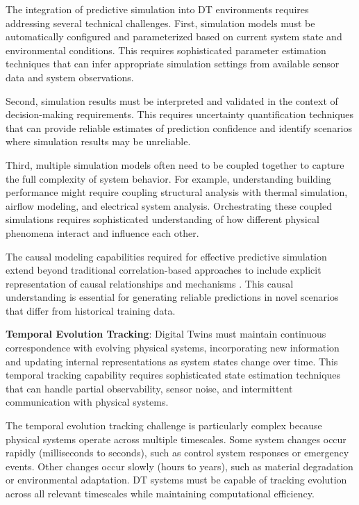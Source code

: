 The integration of predictive simulation into DT environments requires addressing several technical challenges. First, simulation models must be automatically configured and parameterized based on current system state and environmental conditions. This requires sophisticated parameter estimation techniques that can infer appropriate simulation settings from available sensor data and system observations.

Second, simulation results must be interpreted and validated in the context of decision-making requirements. This requires uncertainty quantification techniques that can provide reliable estimates of prediction confidence and identify scenarios where simulation results may be unreliable.

Third, multiple simulation models often need to be coupled together to capture the full complexity of system behavior. For example, understanding building performance might require coupling structural analysis with thermal simulation, airflow modeling, and electrical system analysis. Orchestrating these coupled simulations requires sophisticated understanding of how different physical phenomena interact and influence each other.

The causal modeling capabilities required for effective predictive simulation extend beyond traditional correlation-based approaches to include explicit representation of causal relationships and mechanisms \cite{pearl2019seven}. This causal understanding is essential for generating reliable predictions in novel scenarios that differ from historical training data.

\textbf{Temporal Evolution Tracking}: Digital Twins must maintain continuous correspondence with evolving physical systems, incorporating new information and updating internal representations as system states change over time. This temporal tracking capability requires sophisticated state estimation techniques that can handle partial observability, sensor noise, and intermittent communication with physical systems.

The temporal evolution tracking challenge is particularly complex because physical systems operate across multiple timescales. Some system changes occur rapidly (milliseconds to seconds), such as control system responses or emergency events. Other changes occur slowly (hours to years), such as material degradation or environmental adaptation. DT systems must be capable of tracking evolution across all relevant timescales while maintaining computational efficiency.

